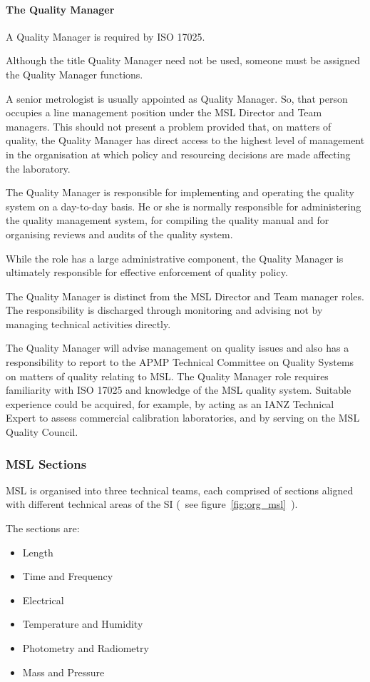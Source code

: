 \paragraph{The Quality Manager}
A Quality Manager is required by ISO 17025. 

Although the title Quality Manager need not be used, someone must be 
assigned the Quality Manager functions. 

A senior metrologist is usually appointed as Quality Manager. So, that person occupies a line management position under the MSL Director and Team managers. This should not present a problem provided that, on matters of quality, the Quality Manager has direct access to the highest level of management in the organisation at which policy and resourcing decisions are made affecting the 
laboratory.

The Quality Manager is responsible for implementing and operating the quality system on a day-to-day basis. He or she is normally responsible for administering the quality management system, for compiling the quality manual and for organising reviews and audits of the quality system.

While the role has a large administrative component, the Quality Manager is ultimately responsible for effective enforcement of quality policy. 

The Quality Manager is distinct from the MSL Director and Team manager roles. The responsibility is discharged through monitoring and advising not by managing technical activities directly.

The Quality Manager will advise management on quality issues and also has a responsibility to report to the APMP Technical Committee on Quality Systems on matters of quality relating to MSL.
The Quality Manager role requires familiarity with ISO 17025 and knowledge of the MSL quality system. Suitable experience could be acquired, for example, by acting as an IANZ Technical Expert to assess commercial calibration laboratories, and by serving on the MSL Quality Council.

\subsubsection{MSL Sections}
MSL is organised into three technical teams, each comprised of sections aligned with different technical areas of the SI (~see figure~\ref{fig:org_msl}~).

The sections are: 
\begin{itemize}
\item	Length
\item	Time and Frequency 
\item	Electrical 
\item	Temperature and Humidity
\item	Photometry and Radiometry
\item	Mass and Pressure
\end{itemize}

